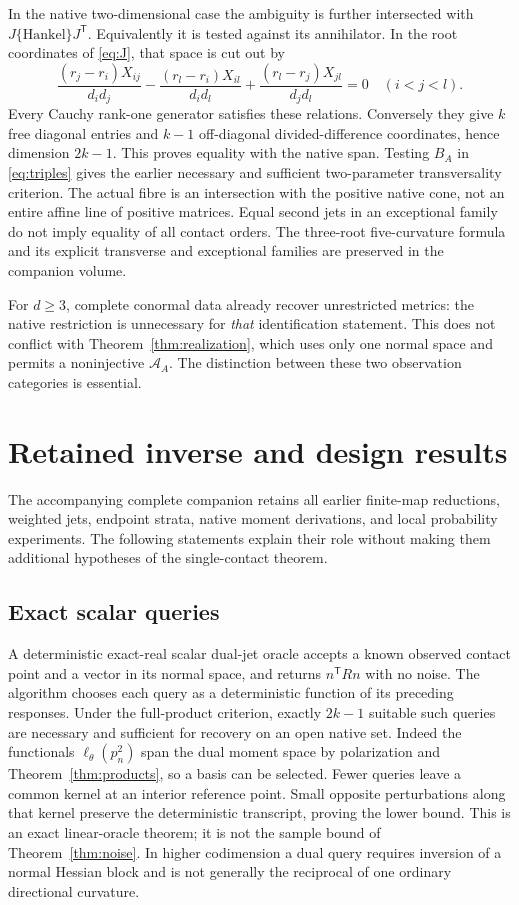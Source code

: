 \documentclass[11pt,reqno]{amsart}
\numberwithin{equation}{section}
\theoremstyle{definition}\newtheorem{definition}[theorem]{Definition}
\theoremstyle{remark}\newtheorem{remark}[theorem]{Remark}
\begin{document}
In the native two-dimensional case the ambiguity is further intersected with $J\{\text{Hankel}\}J^{\mathsf T}$. Equivalently it is tested against its annihilator. In the root coordinates of \eqref{eq:J}, that space is cut out by
\begin{equation}\label{eq:triples}
 \frac{(r_j-r_i)X_{ij}}{d_i d_j}
 -\frac{(r_l-r_i)X_{il}}{d_i d_l}
 +\frac{(r_l-r_j)X_{jl}}{d_j d_l}=0\quad(i<j<l).
\end{equation}
Every Cauchy rank-one generator satisfies these relations. Conversely they give $k$ free diagonal entries and $k-1$ off-diagonal divided-difference coordinates, hence dimension $2k-1$. This proves equality with the native span. Testing $B_A$ in \eqref{eq:triples} gives the earlier necessary and sufficient two-parameter transversality criterion. The actual fibre is an intersection with the positive native cone, not an entire affine line of positive matrices. Equal second jets in an exceptional family do not imply equality of all contact orders. The three-root five-curvature formula and its explicit transverse and exceptional families are preserved in the companion volume.

For $d\ge3$, complete conormal data already recover unrestricted metrics: the native restriction is unnecessary for \emph{that} identification statement. This does not conflict with Theorem~\ref{thm:realization}, which uses only one normal space and permits a noninjective $\mathcal A_A$. The distinction between these two observation categories is essential.

\section{Retained inverse and design results}\label{sec:companions}
The accompanying complete companion retains all earlier finite-map reductions, weighted jets, endpoint strata, native moment derivations, and local probability experiments. The following statements explain their role without making them additional hypotheses of the single-contact theorem.

\subsection{Exact scalar queries}
A deterministic exact-real scalar dual-jet oracle accepts a known observed contact point and a vector in its normal space, and returns $n^{\mathsf T}Rn$ with no noise. The algorithm chooses each query as a deterministic function of its preceding responses. Under the full-product criterion, exactly $2k-1$ suitable such queries are necessary and sufficient for recovery on an open native set. Indeed the functionals $\ell_\theta(p_n^2)$ span the dual moment space by polarization and Theorem~\ref{thm:products}, so a basis can be selected. Fewer queries leave a common kernel at an interior reference point. Small opposite perturbations along that kernel preserve the deterministic transcript, proving the lower bound. This is an exact linear-oracle theorem; it is not the sample bound of Theorem~\ref{thm:noise}. In higher codimension a dual query requires inversion of a normal Hessian block and is not generally the reciprocal of one ordinary directional curvature.
\end{document}
